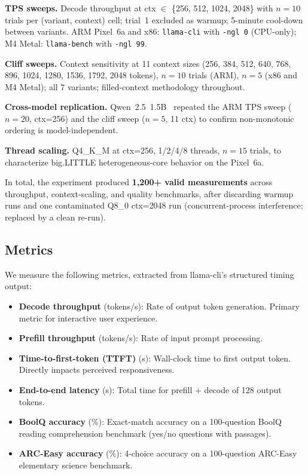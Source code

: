 \documentclass[conference]{IEEEtran}
\begin{document}
\textbf{TPS sweeps.}
Decode throughput at ctx $\in$ \{256, 512, 1024, 2048\} with $n{=}10$ trials per
(variant, context) cell; trial~1 excluded as warmup; 5-minute cool-down between variants.
ARM Pixel~6a and x86: \texttt{llama-cli} with \texttt{-ngl~0} (CPU-only);
M4 Metal: \texttt{llama-bench} with \texttt{-ngl~99}.

\textbf{Cliff sweeps.}
Context sensitivity at 11 context sizes
(256, 384, 512, 640, 768, 896, 1024, 1280, 1536, 1792, 2048 tokens),
$n{=}10$ trials (ARM), $n{=}5$ (x86 and M4 Metal);
all 7 variants; filled-context methodology throughout.

\textbf{Cross-model replication.}
Qwen~2.5~1.5B~\cite{qwen25} repeated the ARM TPS sweep ($n{=}20$, ctx=256) and
the cliff sweep ($n{=}5$, 11 ctx) to confirm non-monotonic ordering is
model-independent.

\textbf{Thread scaling.}
Q4\_K\_M at ctx=256, 1/2/4/8 threads, $n{=}15$ trials, to characterize
big.LITTLE heterogeneous-core behavior on the Pixel~6a.

In total, the experiment produced \textbf{1,200+ valid measurements} across throughput,
context-scaling, and quality benchmarks, after discarding warmup runs and one contaminated
Q8\_0 ctx=2048 run (concurrent-process interference; replaced by a clean re-run).

\subsection{Metrics}

We measure the following metrics, extracted from llama-cli's structured timing output:
\begin{itemize}
  \item \textbf{Decode throughput} (tokens/s): Rate of output token generation.
        Primary metric for interactive user experience.
  \item \textbf{Prefill throughput} (tokens/s): Rate of input prompt processing.
  \item \textbf{Time-to-first-token (TTFT)} (s): Wall-clock time to first output
        token. Directly impacts perceived responsiveness.
  \item \textbf{End-to-end latency} (s): Total time for prefill + decode of 128
        output tokens.
  \item \textbf{BoolQ accuracy} (\%): Exact-match accuracy on a 100-question
        BoolQ reading comprehension benchmark (yes/no questions with passages).
  \item \textbf{ARC-Easy accuracy} (\%): 4-choice accuracy on a 100-question
        ARC-Easy elementary science benchmark.
\end{itemize}
\end{document}

